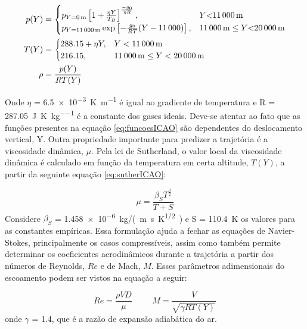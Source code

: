 \begin{equation}
\label{eq:funcoesICAO}
\begin{aligned}
p(Y) &=\begin{cases}
			p_{Y=\qty{0}{\metre}}\left[1 + \frac{\eta Y}{T_{B}} \right]^{\frac{-g_{0}}{\eta R}} , & Y \qty{< 11000}{\metre}\\
            p_{Y=\qty{11000}{\metre}} \exp\left[-\frac{g_{0}}{RT}(Y-\num{11000}) \right], & \qty{11000}{\metre} \leq Y \qty{< 20000}{\metre}
		 \end{cases}
\\
T(Y) &=\begin{cases}
			\num{288,15} + \eta Y, & Y < \qty{11000}{\metre}\\
            \num{216,15}, & \qty{11000}{\metre} \leq Y < \qty{20000}{\metre}
		 \end{cases}
\\
\rho &= \frac{p(Y)}{RT(Y)}
\end{aligned}
\end{equation}

Onde \(\eta\) = \qty{6,5e-3}{\kelvin\per\metre} é igual ao gradiente de temperatura e R = \qty{287,05}{\joule\per\kelvin\per\kilogram} é a constante dos gases ideais. Deve-se atentar ao fato que as funções presentes na equação \ref{eq:funcoesICAO} são dependentes do deslocamento vertical, Y. Outra propriedade importante para predizer a trajetória é a viscosidade dinâmica, \(\mu\). Pela lei de Sutherland, o valor local da viscosidade dinâmica é calculado em função da temperatura em certa altitude, \(T(Y)\), a partir da seguinte equação \ref{eq:sutherICAO}:

\begin{equation}
\label{eq:sutherICAO}
\mu = \frac{\beta_{S}T^{\frac{3}{2}}}{T + S}
\end{equation}
%
Considere \(\beta_{S}\) = \qty{1,458e-6}{kg/(m.s.K^{1/2})} e S = \qty{110,4}{\kelvin} os valores para as constantes empíricas. Essa formulação ajuda a fechar as equações de Navier-Stokes, principalmente os casos compressíveis, assim como também permite determinar os coeficientes aerodinâmicos durante a trajetória a partir dos números de Reynolds, \(Re\) e de Mach, \(M\). Esses parâmetros adimensionais do escoamento podem ser vistos na equação a seguir:

\begin{equation}
    Re = \frac{\rho V D}{\mu} \hspace{1cm}
    M = \frac{V}{\sqrt{\gamma RT(Y)}}
\end{equation}
%
onde \(\gamma\) = \num{1,4}, que é a razão de expansão adiabática do ar.

